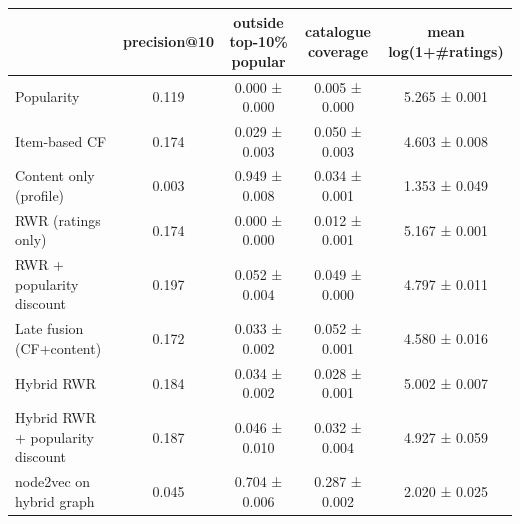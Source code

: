 \begin{tabular}{lcccc}
\toprule
 & precision@10 & outside top-10\% popular & catalogue coverage & mean log(1+\#ratings) \\
\midrule
Popularity & 0.119 & 0.000 ± 0.000 & 0.005 ± 0.000 & 5.265 ± 0.001 \\
Item-based CF & 0.174 & 0.029 ± 0.003 & 0.050 ± 0.003 & 4.603 ± 0.008 \\
Content only (profile) & 0.003 & 0.949 ± 0.008 & 0.034 ± 0.001 & 1.353 ± 0.049 \\
RWR (ratings only) & 0.174 & 0.000 ± 0.000 & 0.012 ± 0.001 & 5.167 ± 0.001 \\
RWR + popularity discount & 0.197 & 0.052 ± 0.004 & 0.049 ± 0.000 & 4.797 ± 0.011 \\
Late fusion (CF+content) & 0.172 & 0.033 ± 0.002 & 0.052 ± 0.001 & 4.580 ± 0.016 \\
Hybrid RWR & 0.184 & 0.034 ± 0.002 & 0.028 ± 0.001 & 5.002 ± 0.007 \\
Hybrid RWR + popularity discount & 0.187 & 0.046 ± 0.010 & 0.032 ± 0.004 & 4.927 ± 0.059 \\
node2vec on hybrid graph & 0.045 & 0.704 ± 0.006 & 0.287 ± 0.002 & 2.020 ± 0.025 \\
\bottomrule
\end{tabular}
